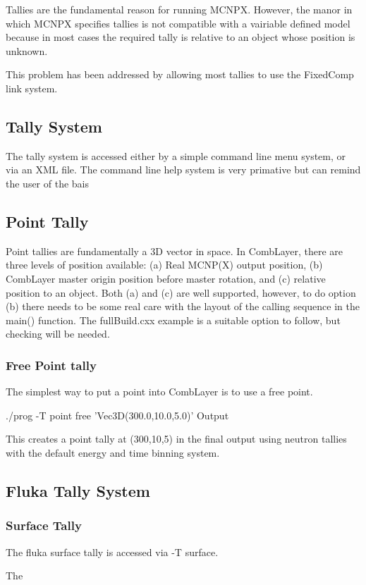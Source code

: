 
Tallies are the fundamental reason for running MCNPX. However, the
manor in which MCNPX specifies tallies is not compatible with a
vairiable defined model because in most cases the required tally is relative 
to an object whose position is unknown. 

This problem has been addressed by allowing most tallies to use the 
FixedComp link system. 

\subsection{Tally System}

The tally system is accessed either by a simple command line menu
system, or via an XML file. The command line help system is very
primative but can remind the user of the bais

\subsection{Point Tally}
\label{PointTally}

Point tallies are fundamentally a 3D vector in space. In CombLayer,
there are three levels of position available: (a) Real MCNP(X) output
position, (b) CombLayer master origin position before master rotation,
and (c) relative position to an object. Both (a) and (c) are well
supported, however, to do option (b) there needs to be some real care
with the layout of the calling sequence in the main() function. The
fullBuild.cxx example is a suitable option to follow, but checking
will be needed.

\subsubsection{Free Point tally}

The simplest way to put a point into CombLayer is to use a free point.
\begin{bash}
./prog -T point free 'Vec3D(300.0,10.0,5.0)' Output
\end{bash}

This creates a point tally at (300,10,5) in the final output using
neutron tallies with the default energy and time binning system.

\subsection{Fluka Tally System}

\subsubsection{Surface Tally}

The fluka surface tally is accessed via -T surface.

The 
